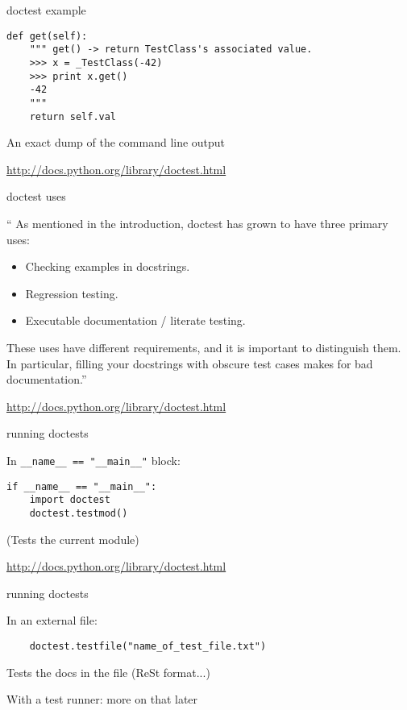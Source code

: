 \documentclass{beamer}
\begin{document}
\begin{frame}[fragile]{doctest example}

\begin{verbatim}
def get(self):
    """ get() -> return TestClass's associated value.
    >>> x = _TestClass(-42)
    >>> print x.get()
    -42
    """
    return self.val
\end{verbatim}

\vfill
{\Large An exact dump of the command line output}

\vfill
\url{http://docs.python.org/library/doctest.html}
\end{frame} 

\begin{frame}[fragile]{doctest uses}

{\large
``
As mentioned in the introduction, doctest has grown to have three primary uses:

\begin{itemize}
    \item Checking examples in docstrings.
    \item Regression testing.
    \item Executable documentation / literate testing.
\end{itemize}

These uses have different requirements, and it is important to distinguish them.
In particular, filling your docstrings with obscure test cases makes for bad
documentation.''
}

\vfill
\url{http://docs.python.org/library/doctest.html}
\end{frame} 

\begin{frame}[fragile]{running doctests}

{\large In \verb|__name__ == "__main__"| block:}

\begin{verbatim}
if __name__ == "__main__":
    import doctest
    doctest.testmod()
\end{verbatim}

{\large (Tests the current module) }


\vfill
\url{http://docs.python.org/library/doctest.html}

\end{frame} 

\begin{frame}[fragile]{running doctests}

\vfill
{\large In an external file:}

\begin{verbatim}
    doctest.testfile("name_of_test_file.txt")
\end{verbatim}

{\large Tests the docs in the file (ReSt format...) }


\vfill
{\large With a test runner: more on that later}

\vfill
\end{frame} 
\end{document}
